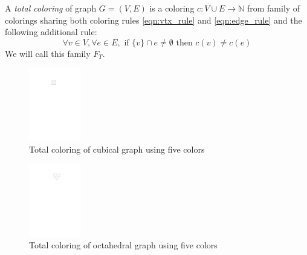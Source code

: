 \begin{definition}
    A \textit{total coloring} of graph $G=(V,E)$ is a coloring $c: V \cup E \rightarrow \mathbb{N}$ from family of colorings sharing both coloring rules \ref{eqn:vtx_rule} and \ref{eqn:edge_rule} and the following additional rule: 
    \begin{equation}\label{eqn:tot_rule}
    \forall v \in V,  \forall e \in E, \text{ if } \{v\} \cap e \neq \emptyset \text{ then } c(v) \neq c(e) \tag{$R_T$}
    \end{equation}
    We will call this family $F_T$.
\end{definition}

\begin{figure}[H]
    \centering
    \includegraphics[width=0.2\textwidth]{../Resources/Figs/cubical_tot_colr.pdf}
    \caption{Total coloring of cubical graph using five colors}
    \label{fig:cubical_tot_coloring}
\end{figure}

\begin{figure}[H]
    \centering
    \includegraphics[width=0.2\textwidth]{../Resources/Figs/octahedral_tot_colr.pdf}
    \caption{Total coloring of octahedral graph using five colors}
    \label{fig:octahedral_tot_coloring}
\end{figure}







